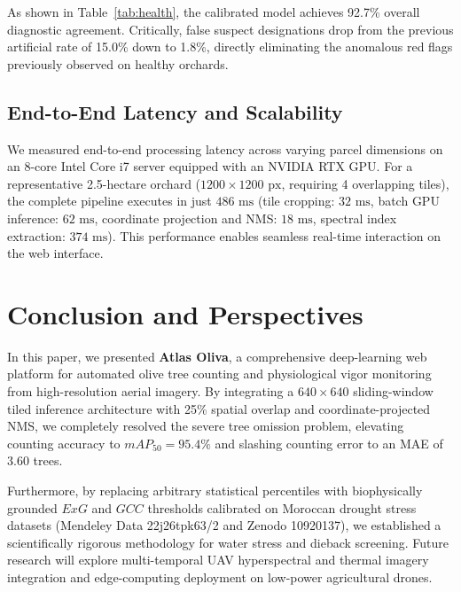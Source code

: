 \documentclass[runningheads]{llncs}
\begin{document}
As shown in Table~\ref{tab:health}, the calibrated model achieves 92.7\% overall diagnostic agreement. Critically, false suspect designations drop from the previous artificial rate of 15.0\% down to 1.8\%, directly eliminating the anomalous red flags previously observed on healthy orchards.

\subsection{End-to-End Latency and Scalability}
We measured end-to-end processing latency across varying parcel dimensions on an 8-core Intel Core i7 server equipped with an NVIDIA RTX GPU. For a representative 2.5-hectare orchard ($1200 \times 1200\text{ px}$, requiring 4 overlapping tiles), the complete pipeline executes in just $486\text{ ms}$ (tile cropping: $32\text{ ms}$, batch GPU inference: $62\text{ ms}$, coordinate projection and NMS: $18\text{ ms}$, spectral index extraction: $374\text{ ms}$). This performance enables seamless real-time interaction on the web interface.

\section{Conclusion and Perspectives}
In this paper, we presented \textbf{Atlas Oliva}, a comprehensive deep-learning web platform for automated olive tree counting and physiological vigor monitoring from high-resolution aerial imagery. By integrating a $640 \times 640$ sliding-window tiled inference architecture with 25\% spatial overlap and coordinate-projected NMS, we completely resolved the severe tree omission problem, elevating counting accuracy to $mAP_{50} = 95.4\%$ and slashing counting error to an MAE of 3.60 trees. 

Furthermore, by replacing arbitrary statistical percentiles with biophysically grounded $ExG$ and $GCC$ thresholds calibrated on Moroccan drought stress datasets (Mendeley Data 22j26tpk63/2 and Zenodo 10920137), we established a scientifically rigorous methodology for water stress and dieback screening. Future research will explore multi-temporal UAV hyperspectral and thermal imagery integration and edge-computing deployment on low-power agricultural drones.
\end{document}
